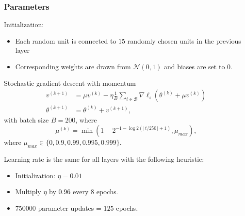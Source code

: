 \begin{frame}
	\frametitle{Parameters}

	Initialization:
	\begin{itemize}
		\item Each random unit is connected to $15$ randomly chosen units in the previous layer
		\item Corresponding weights are drawn from $\mathcal{N}(0,1)$ and biases are set to $0$.
	\end{itemize}



	\begin{block}{Stochastic gradient descent with momentum}
		\begin{align*}
			v^{(k+1)} & = \mu  v^{(k)} - \eta \frac{1}{B} \sum_{i \in \mathcal{B}} \nabla \ell_i (\theta^{(k)} + \mu  v^{(k)})\\
			\theta^{(k+1)} & = \theta^{(k)} + v^{(k+1)},
		\end{align*}
		with batch size $B= 200$, where
		$$
		\mu^{(k)} = \min (1 - 2^{-1 - \log2(\lfloor t/250 \rfloor +1)}, \mu_{max}),
		$$
		where $\mu_{max} \in \{0, 0.9, 0.99, 0.995, 0.999\}$.
	\end{block}



	Learning rate is the same for all layers with the following heuristic:
	\begin{itemize}
		\item Initialization: $\eta = 0.01$
		\item Multiply $\eta$ by $0.96$ every $8$ epochs.
		\item $750000$ parameter updates = $125$ epochs.
	\end{itemize}






\end{frame}




